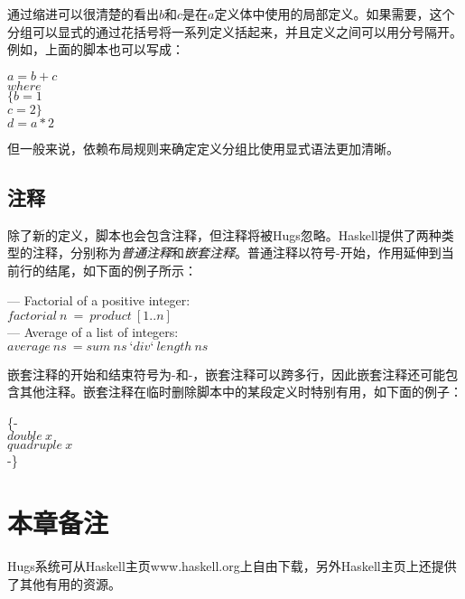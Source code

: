 通过缩进可以很清楚的看出$b$和$c$是在$a$定义体中使用的局部定义。如果需要，这个分组可以显式的通过花括号将一系列定义括起来，并且定义之间可以用分号隔开。例如，上面的脚本也可以写成：

\noindent\hspace*{1cm} $a = b + c$\\
\hspace*{2cm} $        where $\\
\hspace*{3cm} $            \{b = 1$\\
\hspace*{3cm} $            c = 2\}$\\
\hspace*{1cm} $d = a * 2$

但一般来说，依赖布局规则来确定定义分组比使用显式语法更加清晰。

\subsection{注释}

除了新的定义，脚本也会包含注释，但注释将被Hugs忽略。Haskell提供了两种类型的注释，分别称为\textit{普通注释}和\textit{嵌套注释}。普通注释以符号-开始，作用延伸到当前行的结尾，如下面的例子所示：

\noindent\hspace*{1cm} — Factorial of a positive integer:\\
\hspace*{1cm} $factorial~n~=~product~[1 . . n ]$\\
\hspace*{1cm} — Average of a list of integers:\\
\hspace*{1cm} $average~ns~= sum~ns~‘div ‘~length~ns$

嵌套注释的开始和结束符号为{-和-}，嵌套注释可以跨多行，因此嵌套注释还可能包含其他注释。嵌套注释在临时删除脚本中的某段定义时特别有用，如下面的例子：

\noindent\hspace*{1cm} \{-\\
\hspace*{1cm} $double~x$\\
\hspace*{1cm} $quadruple~x$\\
\hspace*{1cm} -\}

\section{本章备注}
Hugs系统可从Haskell主页www.haskell.org上自由下载，另外Haskell主页上还提供了其他有用的资源。

